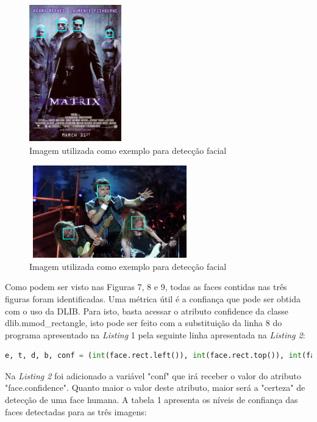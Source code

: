 \documentclass[conference]{IEEEtran}
\begin{document}
	    \begin{figure}[h!b]
			\centering \includegraphics[width=4cm,height=6cm]{matrix_detectada.png}
			\caption{Imagem utilizada como exemplo para detecção facial \cite{b6}} 
		\end{figure}

         \begin{figure}[h!b]
			\centering \includegraphics[width=7cm,height=4cm]{iron_detectada.png}
			\caption{Imagem utilizada como exemplo para detecção facial \cite{b7}} 
		\end{figure}
		
        Como podem ser visto nas Figuras 7, 8 e 9, todas as faces contidas nas três figuras foram identificadas. Uma métrica útil é a confiança que pode ser obtida com o uso da DLIB. Para isto, basta acessar o atributo confidence da classe dlib.mmod\_rectangle, isto pode ser feito com a substituição da linha 8 do programa apresentado na \textit{Listing} 1 pela seguinte linha apresentada na \textit{Listing 2}:
        
\begin{lstlisting}[breaklines=true, language=Python, caption=Código para descobrir a confiança no DLIB]
    e, t, d, b, conf = (int(face.rect.left()), int(face.rect.top()), int(face.rect.right()), int(face.rect.bottom()), face.confidence)\end{lstlisting}

        Na \textit{Listing 2} foi adicionado a variável "conf" que irá receber o valor do atributo "face.confidence". Quanto maior o valor deste atributo, maior será a "certeza" de detecção de uma face humana. A tabela 1 apresenta os níveis de confiança das faces detectadas para as três imagens:
        
\end{document}
